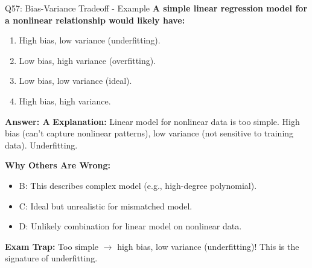 \documentclass[8pt]{beamer}
\begin{document}
	\begin{frame}{Q57: Bias-Variance Tradeoff - Example}
		\fontsize{6.5}{7.5}\selectfont
		\textbf{A simple linear regression model for a nonlinear relationship would likely have:}
		
		\begin{enumerate}
			\item High bias, low variance (underfitting).
			\item Low bias, high variance (overfitting).
			\item Low bias, low variance (ideal).
			\item High bias, high variance.
		\end{enumerate}
		
		\vspace{0.05cm}
		\textcolor{myblue}{\textbf{Answer: A}}
		\vspace{0.05cm}
		\textcolor{myblue}{\textbf{Explanation:}} Linear model for nonlinear data is too simple. High bias (can't capture nonlinear patterns), low variance (not sensitive to training data). Underfitting.
		
		\vspace{0.05cm}
		\textcolor{myred}{\textbf{Why Others Are Wrong:}}
		\begin{itemize}
			\item \textcolor{myred}{B:} This describes complex model (e.g., high-degree polynomial).
			\item \textcolor{myred}{C:} Ideal but unrealistic for mismatched model.
			\item \textcolor{myred}{D:} Unlikely combination for linear model on nonlinear data.
		\end{itemize}
		
		\textcolor{myred}{\textbf{Exam Trap:}} Too simple $\rightarrow$ \textcolor{myblue}{high bias, low variance} (underfitting)! This is the signature of underfitting.
	\end{frame}
	
\end{document}

